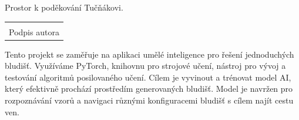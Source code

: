 \documentclass[12pt, a4paper,
twoside,        %
openright
]{report}
\newcommand\datumOdevzdani{1. 1. 2024} %
\begin{document}
\cleardoublepage %
	

	
	\noindent Prostor k poděkování Tučňákovi.
	
	\vspace*{0.7\textheight} %

	\vfill
	\noindent{V Opavě \datumOdevzdani\\}
	\noindent
	\begin{minipage}{\linewidth}
		\hspace{9.5cm} 
		\begin{tabular}{@{}p{6cm}@{}}
			\dotfill \\
			Podpis autora
		\end{tabular}
	\end{minipage}
	
	\cleardoublepage %


\noindent Tento projekt se zaměřuje na aplikaci umělé inteligence pro řešení jednoduchých bludišť. Využíváme PyTorch, knihovnu pro strojové učení, nástroj pro vývoj a testování algoritmů posilovaného učení. Cílem je vyvinout a trénovat model AI, který efektivně prochází prostředím generovaných bludišť. Model je navržen pro rozpoznávání vzorů a navigaci různými konfiguracemi bludišť s cílem najít cestu ven.

\vspace{18pt}

\end{document}
